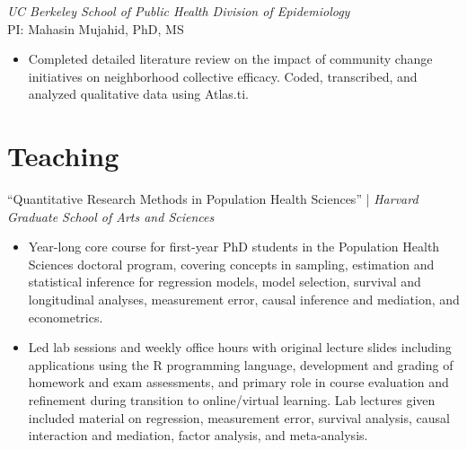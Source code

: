 \documentclass{cv_style}
\begin{document}
\textit{UC Berkeley School of Public Health Division of Epidemiology} \\
PI: Mahasin Mujahid, PhD, MS
\begin{itemize}
    \item Completed detailed literature review on the impact of community change initiatives on neighborhood collective efficacy. Coded, transcribed, and analyzed qualitative data using Atlas.ti.
\end{itemize}


\parskip -5pt 
\section{Teaching}

``Quantitative Research Methods in Population Health Sciences'' | \textit{Harvard Graduate School of Arts and Sciences}
\begin{itemize}
  \vspace{0em} \item Year-long core course for first-year PhD students in the Population Health Sciences doctoral program, covering concepts in sampling, estimation and statistical inference for regression models, model selection, survival and longitudinal analyses, measurement error, causal inference and mediation, and econometrics. 
  \item \parskip 1pt Led lab sessions and weekly office hours with original lecture slides including applications using the R programming language, development and grading of homework and exam assessments, and primary role in course evaluation and refinement during transition to online/virtual learning. Lab lectures given included material on regression, measurement error, survival analysis, causal interaction and mediation, factor analysis, and meta-analysis.
\end{itemize}
\end{document}
